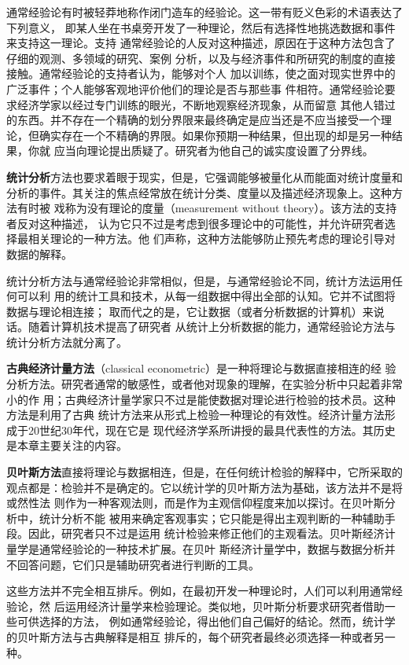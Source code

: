 通常经验论有时被轻莽地称作闭门造车的经验论。这一带有贬义色彩的术语表达了下列意义，
即某人坐在书桌旁开发了一种理论，然后有选择性地挑选数据和事件来支持这一理论。支持
通常经验论的人反对这种描述，原因在于这种方法包含了仔细的观测、多领域的研究、案例
分析，以及与经济事件和所研究的制度的直接接触。通常经验论的支持者认为，能够对个人
加以训练，使之面对现实世界中的广泛事件；个人能够客观地评价他们的理论是否与那些事
件相符。通常经验论要求经济学家以经过专门训练的眼光，不断地观察经济现象，从而留意
其他人错过的东西。并不存在一个精确的划分界限来最终确定是应当还是不应当接受一个理
论，但确实存在一个不精确的界限。如果你预期一种结果，但出现的却是另一种结果，你就
应当向理论提出质疑了。研究者为他自己的诚实度设置了分界线。

\textbf{统计分析}方法也要求着眼于现实，但是，它强调能够被量化从而能面对统计度量和
分析的事件。其关注的焦点经常放在统计分类、度量以及描述经济现象上。这种方法有时被
戏称为没有理论的度量（measurement without theory）。该方法的支持者反对这种描述，
认为它只不过是考虑到很多理论中的可能性，并允许研究者选择最相关理论的一种方法。他
们声称，这种方法能够防止预先考虑的理论引导对数据的解释。

统计分析方法与通常经验论非常相似，但是，与通常经验论不同，统计方法运用任何可以利
用的统计工具和技术，从每一组数据中得出全部的认知。它并不试图将数据与理论相连接；
取而代之的是，它让数据（或者分析数据的计算机）来说话。随着计算机技术提高了研究者
从统计上分析数据的能力，通常经验论方法与统计分析方法就分离了。

\textbf{古典经济计量方法}（classical econometric）是一种将理论与数据直接相连的经
验分析方法。研究者通常的敏感性，或者他对现象的理解，在实验分析中只起着非常小的作
用；古典经济计量学家只不过是能使数据对理论进行检验的技术员。这种方法是利用了古典
统计方法来从形式上检验一种理论的有效性。经济计量方法形成于20世纪30年代，现在它是
现代经济学系所讲授的最具代表性的方法。其历史是本章主要关注的内容。

\textbf{贝叶斯方法}直接将理论与数据相连，但是，在任何统计检验的解释中，它所采取的
观点都是：检验并不是确定的。它以统计学的贝叶斯方法为基础，该方法并不是将或然性法
则作为一种客观法则，而是作为主观信仰程度来加以探讨。在贝叶斯分析中，统计分析不能
被用来确定客观事实；它只能是得出主观判断的一种辅助手段。因此，研究者只不过是运用
统计检验来修正他们的主观看法。贝叶斯经济计量学是通常经验论的一种技术扩展。在贝叶
斯经济计量学中，数据与数据分析并不回答问题，它们只是辅助研究者进行判断的工具。

这些方法并不完全相互排斥。例如，在最初开发一种理论时，人们可以利用通常经验论，然
后运用经济计量学来检验理论。类似地，贝叶斯分析要求研究者借助一些可供选择的方法，
例如通常经验论，得出他们自己偏好的结论。然而，统计学的贝叶斯方法与古典解释是相互
排斥的，每个研究者最终必须选择一种或者另一种。

